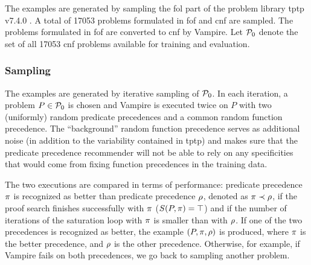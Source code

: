 The examples are generated by sampling the \gls{fol} part of the problem library \gls{tptp} v7.4.0 \cite{10.1007/978-3-030-29436-6_29}.
A total of \num{17053} problems formulated in \gls{fof} and \gls{cnf} are sampled.
The problems formulated in \gls{fof} are converted to \gls{cnf} by Vampire.
Let $\operatorname{\mathcal{P}_{0}}$ denote the set of all \num{17053} \gls{cnf} problems available for training and evaluation.

\subsubsection{Sampling}

The examples are generated by iterative sampling of $\operatorname{\mathcal{P}_{0}}$.
In each iteration, a problem $P \in \operatorname{\mathcal{P}_{0}}$ is chosen and Vampire is executed twice on $P$
with two (uniformly) random predicate precedences and a common random function precedence.
The ``background'' random function precedence serves as additional noise (in addition to the variability 
contained in \gls{tptp}) and makes sure that the predicate precedence recommender
will not be able to rely on any specificities that would come from fixing function precedences in the training data.

The two executions are compared in terms of performance:
predicate precedence $\pi$ is recognized as better than predicate precedence $\rho$,
denoted as $\pi \prec \rho$,
if the proof search finishes successfully with $\pi$ ($S(P, \pi) = \top$)
and if the number of iterations of the saturation loop with $\pi$ is smaller than with $\rho$.
If one of the two precedences is recognized as better,
the example $(P, \pi, \rho)$ is produced,
where $\pi$ is the better precedence,
and $\rho$ is the other precedence.
Otherwise, for example, if Vampire fails on both precedences, we go back to sampling another problem.

